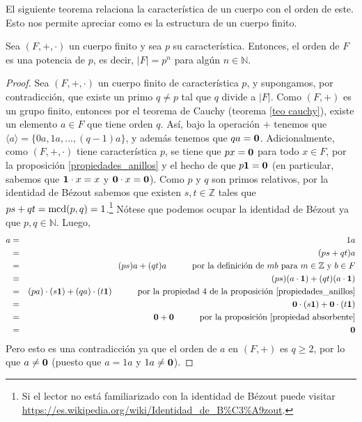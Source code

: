 El siguiente teorema relaciona la característica de un cuerpo con el
orden de este. Esto nos permite apreciar como es la estructura de un
cuerpo finito.
\begin{theorem}\label{orden cuerpo pot carac}
	Sea $(F,+,\cdot)$ un cuerpo finito y sea $p$ su
	característica. Entonces, el orden de $F$ es una potencia de
	$p$, es decir, $|F|=p^n$ para algún $n\in \mathbb{N}$.
\end{theorem}

\begin{proof}
Sea $(F,+,\cdot)$ un cuerpo finito de característica $p$, y
supongamos, por contradicción, que existe un primo $q\neq p$ tal que
$q$ divide a $|F|$. Como $(F,+)$ es un grupo finito, entonces por el
teorema de Cauchy (teorema \ref{teo cauchy}), existe un elemento $a\in
F$ que tiene orden $q$. Así, bajo la operación $+$ tenemos que
$\langle a\rangle = \{ 0 a, 1 a,...,(q-1) a\}$, y además tenemos que
$q a = \mathbf{0}$.
Adicionalmente, como $(F,+,\cdot)$ tiene característica $p$, se tiene
que $p x = \mathbf{0} $ para todo $x \in F$, por la
proposición \ref{propiedades_anillos} y el hecho de que $p \mathbf{1} =\mathbf{0} $
(en particular, sabemos que $\mathbf{1} \cdot x = x$ y $\mathbf{0} \cdot x
= \mathbf{0}$). Como $p$ y $q$ son primos relativos, por la identidad de
Bézout sabemos que existen $s,t\in \mathbb{Z}$ tales que $p s + q t
= {\rm mcd}(p,q) = 1$.\footnote{Si el lector no está familiarizado con la
identidad de Bézout puede
visitar \url{https://es.wikipedia.org/wiki/Identidad_de_B\%C3\%A9zout}.}
Nótese que podemos ocupar la identidad de Bézout ya que
$p,q\in\mathbb{N}$.
Luego,
\begin{eqnarray*}
	a &=& 1a\\
        &=& (p s + q t) a\\
        &=& (p s) a + (q t) a \quad\quad\quad \text{por la definición de $m b$ para $m \in \mathbb{Z}$ y $b \in F$}\\
        &=& (p s) (a \cdot \mathbf{1}) + (q t) (a \cdot \mathbf{1})\\
	&=& (pa) \cdot (s\mathbf{1}) + (qa)\cdot (t\mathbf{1}) \quad\quad\quad \text{por la propiedad 4 de la proposición \ref{propiedades_anillos}}\\
	&=& \mathbf{0} \cdot (s\mathbf{1}) + \mathbf{0} \cdot (t\mathbf{1})\\
	&=& \mathbf{0} + \mathbf{0} \quad\quad\quad \text{por la proposición \ref{propiedad absorbente}}\\
        &=& \mathbf{0}
\end{eqnarray*}
Pero esto es una contradicción ya que el orden de $a$ en $(F,+)$ es
$q\geq 2$, por lo que $a \neq \mathbf{0}$ (puesto que $a = 1a$ y $1a \neq \mathbf{0}$).
\end{proof}

